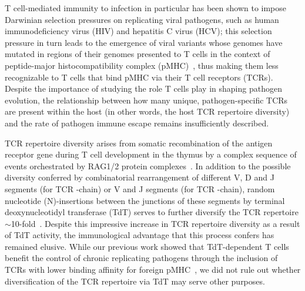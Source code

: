 T cell-mediated immunity to infection in particular has been shown to impose Darwinian selection pressures on replicating viral pathogens, such as human immunodeficiency virus (HIV) and hepatitis C virus (HCV); this selection pressure in turn leads to the emergence of viral variants whose genomes have mutated in regions of their genomes presented to T cells in the context of peptide-major histocompatibility complex (pMHC)~\cite{walker2012t,petrovic2012hepatitis}, thus making them less recognizable to T cells that bind pMHC via their T cell receptors (TCRs). Despite the importance of studying the role T cells play in shaping pathogen evolution, the relationship between how many unique, pathogen-specific TCRs are present within the host (in other words, the host TCR repertoire diversity) and the rate of pathogen immune escape remains insufficiently described.

TCR repertoire diversity arises from somatic recombination of the antigen receptor gene during T cell development in the thymus by a complex sequence of events orchestrated by RAG1/2 protein complexes~\cite{schatz2011recombination}. In addition to the possible diversity conferred by combinatorial rearrangement of different V, D and J segments (for TCR \textbeta{}-chain) or V and J segments (for TCR \textalpha{}-chain), random nucleotide (N)-insertions between the junctions of these segments by terminal deoxynucleotidyl transferase (TdT) serves to further diversify the TCR repertoire $\sim$10-fold~\cite{schatz2011recombination,gilfillan1995mice,cabaniols2001most,litman2010origins,davis1988t,murugan2012statistical,zarnitsyna2013estimating}. Despite this impressive increase in TCR repertoire diversity as a result of TdT activity, the immunological advantage that this process confers has remained elusive. While our previous work showed that TdT-dependent T cells benefit the control of chronic replicating pathogens through the inclusion of TCRs with lower binding affinity for foreign pMHC~\cite{jamaleddine2022chronic}, we did not rule out whether diversification of the TCR repertoire via TdT may serve other purposes.


